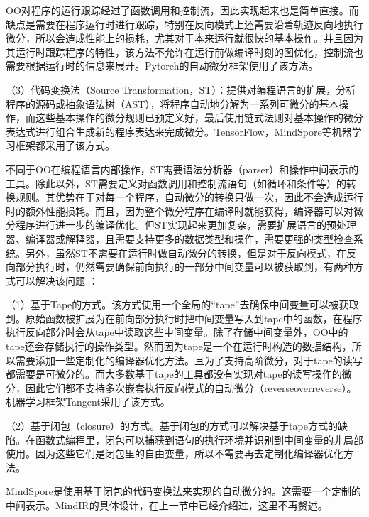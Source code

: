 \documentclass[letterpaper,10pt,english]{sphinxmanual}
\begin{document}
\sphinxAtStartPar
OO对程序的运行跟踪经过了函数调用和控制流，因此实现起来也是简单直接。而缺点是需要在程序运行时进行跟踪，特别在反向模式上还需要沿着轨迹反向地执行微分，所以会造成性能上的损耗，尤其对于本来运行就很快的基本操作。并且因为其运行时跟踪程序的特性，该方法不允许在运行前做编译时刻的图优化，控制流也需要根据运行时的信息来展开。Pytorch的自动微分框架使用了该方法。

\sphinxAtStartPar
（3）代码变换法（Source
Transformation，ST）：提供对编程语言的扩展，分析程序的源码或抽象语法树（AST），将程序自动地分解为一系列可微分的基本操作，而这些基本操作的微分规则已预定义好，最后使用链式法则对基本操作的微分表达式进行组合生成新的程序表达来完成微分。TensorFlow，MindSpore等机器学习框架都采用了该方式。

\sphinxAtStartPar
不同于OO在编程语言内部操作，ST需要语法分析器（parser）和操作中间表示的工具。除此以外，ST需要定义对函数调用和控制流语句（如循环和条件等）的转换规则。其优势在于对每一个程序，自动微分的转换只做一次，因此不会造成运行时的额外性能损耗。而且，因为整个微分程序在编译时就能获得，编译器可以对微分程序进行进一步的编译优化。但ST实现起来更加复杂，需要扩展语言的预处理器、编译器或解释器，且需要支持更多的数据类型和操作，需要更强的类型检查系统。另外，虽然ST不需要在运行时做自动微分的转换，但是对于反向模式，在反向部分执行时，仍然需要确保前向执行的一部分中间变量可以被获取到，有两种方式可以解决该问题
 ：

\sphinxAtStartPar
（1）基于Tape的方式。该方式使用一个全局的“tape”去确保中间变量可以被获取到。原始函数被扩展为在前向部分执行时把中间变量写入到tape中的函数，在程序执行反向部分时会从tape中读取这些中间变量。除了存储中间变量外，OO中的tape还会存储执行的操作类型。然而因为tape是一个在运行时构造的数据结构，所以需要添加一些定制化的编译器优化方法。且为了支持高阶微分，对于tape的读写都需要是可微分的。而大多数基于tape的工具都没有实现对tape的读写操作的微分，因此它们都不支持多次嵌套执行反向模式的自动微分（reverse\sphinxhyphen{}over\sphinxhyphen{}reverse）。机器学习框架Tangent采用了该方式。

\sphinxAtStartPar
（2）基于闭包（closure）的方式。基于闭包的方式可以解决基于tape方式的缺陷。在函数式编程里，闭包可以捕获到语句的执行环境并识别到中间变量的非局部使用。因为这些它们是闭包里的自由变量，所以不需要再去定制化编译器优化方法。

\sphinxAtStartPar
MindSpore是使用基于闭包的代码变换法来实现的自动微分的。这需要一个定制的中间表示。MindIR的具体设计，在上一节中已经介绍过，这里不再赘述。
\end{document}
